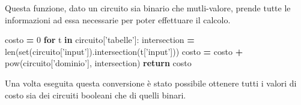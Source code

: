 \documentclass[italian,]{book}
\newenvironment{Shaded}{\begin{snugshade}}{\end{snugshade}}
\newcommand{\BuiltInTok}[1]{#1}
\newcommand{\ControlFlowTok}[1]{\textcolor[rgb]{0.13,0.29,0.53}{\textbf{#1}}}
\newcommand{\DecValTok}[1]{\textcolor[rgb]{0.00,0.00,0.81}{#1}}
\newcommand{\KeywordTok}[1]{\textcolor[rgb]{0.13,0.29,0.53}{\textbf{#1}}}
\newcommand{\NormalTok}[1]{#1}
\newcommand{\OperatorTok}[1]{\textcolor[rgb]{0.81,0.36,0.00}{\textbf{#1}}}
\newcommand{\StringTok}[1]{\textcolor[rgb]{0.31,0.60,0.02}{#1}}
\begin{document}
\newpage

Questa funzione, dato un circuito sia binario che mutli-valore, prende tutte le informazioni ad essa necessarie per poter effettuare il calcolo.

\begin{Shaded}
\begin{Highlighting}[]
\NormalTok{costo }\OperatorTok{=} \DecValTok{0}
\ControlFlowTok{for}\NormalTok{ t }\KeywordTok{in}\NormalTok{ circuito[}\StringTok{'tabelle'}\NormalTok{]:}
\NormalTok{  intersection }\OperatorTok{=} \BuiltInTok{len}\NormalTok{(}\BuiltInTok{set}\NormalTok{(circuito[}\StringTok{'input'}\NormalTok{]).intersection(t[}\StringTok{'input'}\NormalTok{]))}
\NormalTok{  costo }\OperatorTok{=}\NormalTok{ costo }\OperatorTok{+} \BuiltInTok{pow}\NormalTok{(circuito[}\StringTok{'dominio'}\NormalTok{], intersection)}
\ControlFlowTok{return}\NormalTok{ costo}
\end{Highlighting}
\end{Shaded}

Una volta eseguita questa conversione è stato possibile ottenere tutti i valori di costo sia dei circuiti booleani che di quelli binari.
\end{document}
